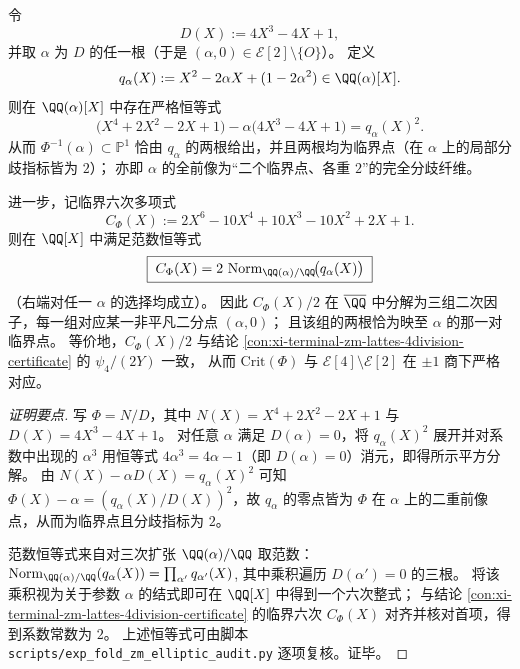 \begin{conclusion}\label{con:xi-terminal-zm-lattes-critical-fiber-square-splitting}
令
\[
D(X):=4X^{3}-4X+1,
\]
并取 \(\alpha\) 为 \(D\) 的任一根（于是 \((\alpha,0)\in\mathcal{E}[2]\setminus\{O\}\)）。
定义
\[
q_{\alpha}(X):=X^{2}-2\alpha X+(1-2\alpha^{2})\in \QQ(\alpha)[X].
\]
则在 \(\QQ(\alpha)[X]\) 中存在严格恒等式
\[
\bigl(X^{4}+2X^{2}-2X+1\bigr)-\alpha\bigl(4X^{3}-4X+1\bigr)=q_{\alpha}(X)^{2}.
\]
从而 \(\Phi^{-1}(\alpha)\subset\mathbb{P}^{1}\) 恰由 \(q_{\alpha}\) 的两根给出，并且两根均为临界点（在 \(\alpha\) 上的局部分歧指标皆为 \(2\)）；
亦即 \(\alpha\) 的全前像为“二个临界点、各重 \(2\)”的完全分歧纤维。
\par
进一步，记临界六次多项式
\[
C_{\Phi}(X):=2X^{6}-10X^{4}+10X^{3}-10X^{2}+2X+1.
\]
则在 \(\QQ[X]\) 中满足范数恒等式
\[
\boxed{\;
C_{\Phi}(X)=2\,\operatorname{Norm}_{\QQ(\alpha)/\QQ}\!\bigl(q_{\alpha}(X)\bigr)\;}
\]
（右端对任一 \(\alpha\) 的选择均成立）。
因此 \(C_{\Phi}(X)/2\) 在 \(\overline{\QQ}\) 中分解为三组二次因子，每一组对应某一非平凡二分点 \((\alpha,0)\)；
且该组的两根恰为映至 \(\alpha\) 的那一对临界点。
等价地，\(C_{\Phi}(X)/2\) 与结论 \ref{con:xi-terminal-zm-lattes-4division-certificate} 的 \(\psi_{4}/(2Y)\) 一致，
从而 \(\mathrm{Crit}(\Phi)\) 与 \(\mathcal{E}[4]\setminus\mathcal{E}[2]\) 在 \(\pm 1\) 商下严格对应。
\end{conclusion}
\begin{proof}[证明要点]
写 \(\Phi=N/D\)，其中
\(
N(X)=X^{4}+2X^{2}-2X+1
\)
与
\(
D(X)=4X^{3}-4X+1
\)。
对任意 \(\alpha\) 满足 \(D(\alpha)=0\)，将 \(q_{\alpha}(X)^{2}\) 展开并对系数中出现的 \(\alpha^{3}\) 用恒等式 \(4\alpha^{3}=4\alpha-1\)（即 \(D(\alpha)=0\)）消元，即得所示平方分解。
由 \(N(X)-\alpha D(X)=q_{\alpha}(X)^{2}\) 可知 \(\Phi(X)-\alpha=(q_{\alpha}(X)/D(X))^{2}\)，故 \(q_{\alpha}\) 的零点皆为 \(\Phi\) 在 \(\alpha\) 上的二重前像点，从而为临界点且分歧指标为 \(2\)。
\par
范数恒等式来自对三次扩张 \(\QQ(\alpha)/\QQ\) 取范数：
\(
\operatorname{Norm}_{\QQ(\alpha)/\QQ}(q_{\alpha}(X))=\prod_{\alpha'}q_{\alpha'}(X)
\),
其中乘积遍历 \(D(\alpha')=0\) 的三根。
将该乘积视为关于参数 \(\alpha\) 的结式即可在 \(\QQ[X]\) 中得到一个六次整式；
与结论 \ref{con:xi-terminal-zm-lattes-4division-certificate} 的临界六次 \(C_{\Phi}(X)\) 对齐并核对首项，得到系数常数为 \(2\)。
上述恒等式可由脚本 \texttt{scripts/exp\_fold\_zm\_elliptic\_audit.py} 逐项复核。证毕。
\end{proof}

